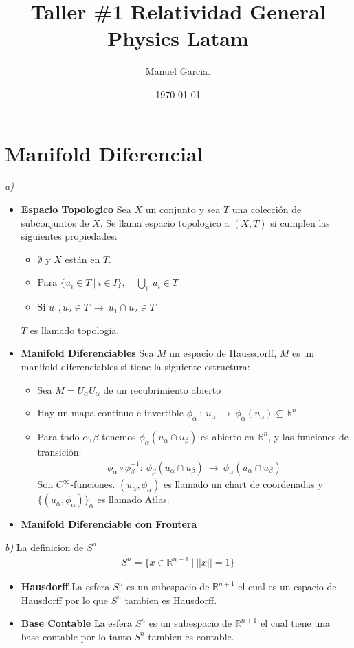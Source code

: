 \documentclass{article}
\title{Taller \#1 Relatividad General Physics Latam }
\author{Manuel Garcia.}
\date{\today}
\begin{document}
\maketitle

\section{Manifold Diferencial}
\textit{a)} 
\begin{itemize}
  \item \textbf{Espacio Topologico } Sea $ X  $ un conjunto y sea $ T  $ una colección de subconjuntos de $ X  $. Se llama espacio topologico a $ (X,T) $ si cumplen las siguientes propiedades:
    \begin{itemize}
      \item $ \emptyset $ y $ X  $ están en $ T  $.
      \item Para $ \{u_i \in T \ | \ i\in I \}, \quad \underset{i }{\bigcup}\  u_i \in T $
      \item Si $ u_1,u_2 \in T \ \rightarrow \ u_1 \cap u_2 \in T $
    \end{itemize}
    $ T  $ es llamado topologia.
  \item \textbf{Manifold Diferenciables } Sea $ M $ un espacio de Haussdorff, $ M  $ es un manifold diferenciables si tiene la siguiente estructura:
    \begin{itemize}
      \item Sea $ M = U_\alpha U_\alpha $ de un recubrimiento abierto
      \item Hay un mapa continuo e invertible $ \phi_\alpha \ : \ u_\alpha \ \rightarrow \ \phi_\alpha(u_\alpha) \subseteq \mathbb{R}^n $
      \item Para todo $ \alpha,\beta $ tenemos $ \phi_\alpha(u_\alpha\cap u_\beta) $ es abierto en $ \mathbb{R}^n  $, y las funciones de transición: 
        \begin{gather*}
          \phi_\alpha \circ \phi_\beta ^ {-1 }: \ \phi_\beta(u_\alpha \cap u_\beta) \ \rightarrow \ \phi_\alpha(u_\alpha \cap u_\beta)
        \end{gather*}
        Son $ C^\infty $-funciones. $ (u_\alpha, \phi_\alpha) $ es llamado un chart de coordenadas y $ \{(u_\alpha, \phi_\alpha)\}_\alpha $ es llamado Atlas.
    \end{itemize}
  \item \textbf{Manifold Diferenciable con Frontera} 
\end{itemize}

\hfill

\textit{b)} La definicion de $ S^n $
\begin{gather*}
  S^n = \{x \in \mathbb{R} ^ {n + 1 } \ |\  || x || = 1\} 
\end{gather*}
\begin{itemize}
  \item \textbf{Hausdorff } La esfera $ S^n  $ es un subespacio de $  \mathbb{R}^ {n+ 1 } $ el cual es un espacio de Hausdorff por lo que $ S^n  $ tambien es Hausdorff.
  \item \textbf{Base Contable } La esfera $ S^n  $ es un subespacio de $ \mathbb{R}^ {n+1 } $ el cual tiene una base contable por lo tanto $ S^n  $ tambien es contable.
\end{itemize}
\end{document}
